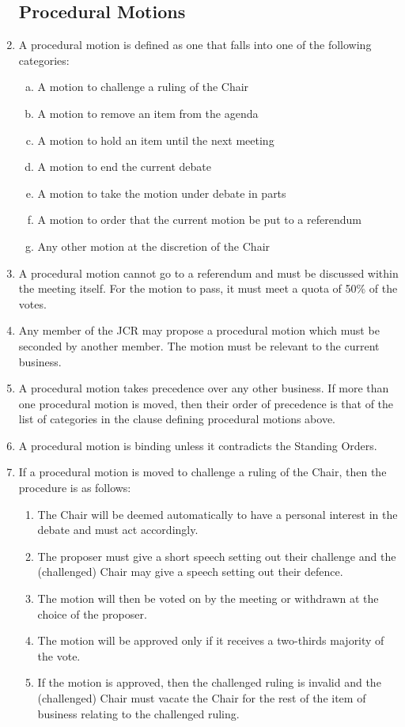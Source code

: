 \documentclass[12pt]{article}  %
\begin{document}
\begin{enumerate}
	\subsection{Procedural Motions}
	\item A procedural motion is defined as one that falls into one of the following categories:
	\begin{enumerate}[(a)]
		\item A motion to challenge a ruling of the Chair
		\item A motion to remove an item from the agenda
		\item A motion to hold an item until the next meeting
		\item A motion to end the current debate
		\item A motion to take the motion under debate in parts
		\item A motion to order that the current motion be put to a referendum
		\item Any other motion at the discretion of the Chair
	\end{enumerate}
	\item A procedural motion cannot go to a referendum and must be discussed within the meeting itself. For the motion to pass, it must meet a quota of 50\% of the votes.
	\item Any member of the JCR may propose a procedural motion which must be seconded by another member. The motion must be relevant to the current business.
	\item A procedural motion takes precedence over any other business. If more than one procedural motion is moved, then their order of precedence is that of the list of categories in the clause defining procedural motions above.
	\item A procedural motion is binding unless it contradicts the Standing Orders.
	\item If a procedural motion is moved to challenge a ruling of the Chair, then the procedure is as follows:
	\begin{enumerate}
		\item The Chair will be deemed automatically to have a personal interest in the debate and must act accordingly.
		\item The proposer must give a short speech setting out their challenge and the (challenged) Chair may give a speech setting out their defence.
		\item The motion will then be voted on by the meeting or withdrawn at the choice of the proposer.
		\item The motion will be approved only if it receives a two-thirds majority of the vote.
		\item If the motion is approved, then the challenged ruling is invalid and the (challenged) Chair must vacate the Chair for the rest of the item of business relating to the challenged ruling.
	\end{enumerate}

\end{enumerate}
\end{document}
